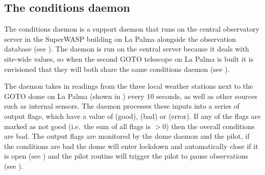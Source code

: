 
\subsection{The conditions daemon}
\label{sec:conditions_daemon}
\begin{colsection}

The conditions daemon is a support daemon that runs on the central observatory server in the SuperWASP building on La Palma alongside the observation database (see ). The daemon is run on the central server because it deals with site-wide values, so when the second GOTO telescope on La Palma is built it is envisioned that they will both share the same conditions daemon (see ).

The daemon takes in readings from the three local weather stations next to the GOTO dome on La Palma (shown in ) every 10 seconds, as well as other sources such as internal sensors. The daemon processes these inputs into a series of output flags, which have a value of  (good),  (bad) or  (error). If any of the flags are marked as not good (i.e.\ the sum of all flags is $>0$) then the overall conditions are bad. The output flags are monitored by the dome daemon and the pilot, if the conditions are bad the dome will enter lockdown and automatically close if it is open (see ) and the pilot  routine will trigger the pilot to pause observations (see ).


\end{colsection}
